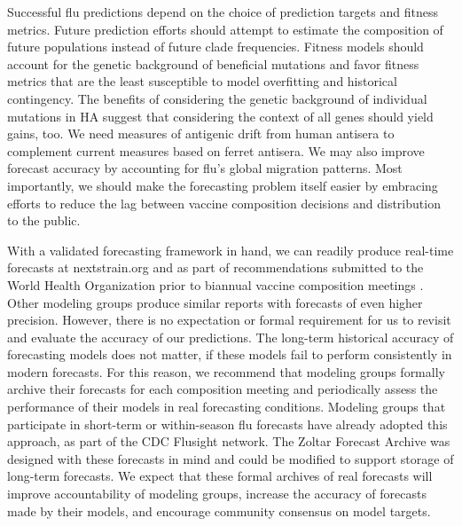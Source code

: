 Successful flu predictions depend on the choice of prediction targets and fitness metrics.
Future prediction efforts should attempt to estimate the composition of future populations instead of future clade frequencies.
Fitness models should account for the genetic background of beneficial mutations and favor fitness metrics that are the least susceptible to model overfitting and historical contingency.
The benefits of considering the genetic background of individual mutations in HA suggest that considering the context of all genes should yield gains, too.
We need measures of antigenic drift from human antisera to complement current measures based on ferret antisera.
We may also improve forecast accuracy by accounting for flu's global migration patterns.
Most importantly, we should make the forecasting problem itself easier by embracing efforts to reduce the lag between vaccine composition decisions and distribution to the public.

With a validated forecasting framework in hand, we can readily produce real-time forecasts at nextstrain.org and as part of recommendations submitted to the World Health Organization prior to biannual vaccine composition meetings \cite{Bedford780627}.
Other modeling groups produce similar reports with forecasts of even higher precision.
However, there is no expectation or formal requirement for us to revisit and evaluate the accuracy of our predictions.
The long-term historical accuracy of forecasting models does not matter, if these models fail to perform consistently in modern forecasts.
For this reason, we recommend that modeling groups formally archive their forecasts for each composition meeting and periodically assess the performance of their models in real forecasting conditions.
Modeling groups that participate in short-term or within-season flu forecasts have already adopted this approach, as part of the CDC Flusight network.
The Zoltar Forecast Archive \citep{reich2020zoltar} was designed with these forecasts in mind and could be modified to support storage of long-term forecasts.
We expect that these formal archives of real forecasts will improve accountability of modeling groups, increase the accuracy of forecasts made by their models, and encourage community consensus on model targets.
